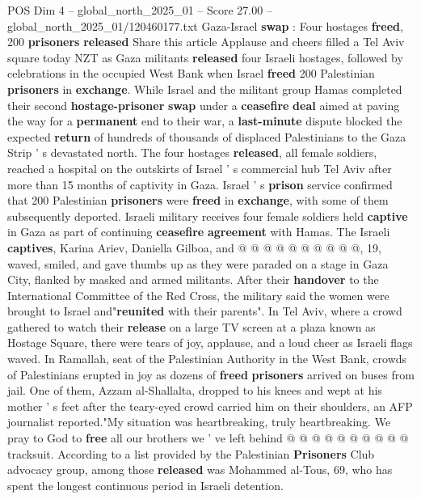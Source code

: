 \begin{textsample}{POS Dim 4 – global\_north\_2025\_01 – Score 27.00 – global\_north\_2025\_01/120460177.txt}  \label{ex:f4_pos_047}
Gaza-Israel \textbf{swap} : Four hostages \textbf{freed}, 200 \textbf{prisoners} \textbf{released} Share this article Applause and cheers filled a Tel Aviv square today NZT as Gaza militants \textbf{released} four Israeli hostages, followed by celebrations in the occupied West Bank when Israel \textbf{freed} 200 Palestinian \textbf{prisoners} in \textbf{exchange}.
While Israel and the militant group Hamas completed their second \textbf{hostage-prisoner} \textbf{swap} under a \textbf{ceasefire} \textbf{deal} aimed at paving the way for a \textbf{permanent} end to their war, a \textbf{last-minute} dispute blocked the expected \textbf{return} of hundreds of thousands of displaced Palestinians to the Gaza Strip ' s devastated north.
The four hostages \textbf{released}, all female soldiers, reached a hospital on the outskirts of Israel ' s commercial hub Tel Aviv after more than 15 months of captivity in Gaza.
Israel ' s \textbf{prison} service confirmed that 200 Palestinian \textbf{prisoners} were \textbf{freed} in \textbf{exchange}, with some of them subsequently deported.
Israeli military receives four female soldiers held \textbf{captive} in Gaza as part of continuing \textbf{ceasefire} \textbf{agreement} with Hamas.
The Israeli \textbf{captives}, Karina Ariev, Daniella Gilboa, and @ @ @ @ @ @ @ @ @ @, 19, waved, smiled, and gave thumbs up as they were paraded on a stage in Gaza City, flanked by masked and armed militants.
After their \textbf{handover} to the International Committee of the Red Cross, the military said the women were brought to Israel and"\textbf{reunited} with their parents".
In Tel Aviv, where a crowd gathered to watch their \textbf{release} on a large TV screen at a plaza known as Hostage Square, there were tears of joy, applause, and a loud cheer as Israeli flags waved.
In Ramallah, seat of the Palestinian Authority in the West Bank, crowds of Palestinians erupted in joy as dozens of \textbf{freed} \textbf{prisoners} arrived on buses from jail.
One of them, Azzam al-Shallalta, dropped to his knees and wept at his mother ' s feet after the teary-eyed crowd carried him on their shoulders, an AFP journalist reported."My situation was heartbreaking, truly heartbreaking.
We pray to God to \textbf{free} all our brothers we ' ve left behind @ @ @ @ @ @ @ @ @ @ tracksuit.
According to a list provided by the Palestinian \textbf{Prisoners} Club advocacy group, among those \textbf{released} was Mohammed al-Tous, 69, who has spent the longest continuous period in Israeli detention.

\end{textsample}
